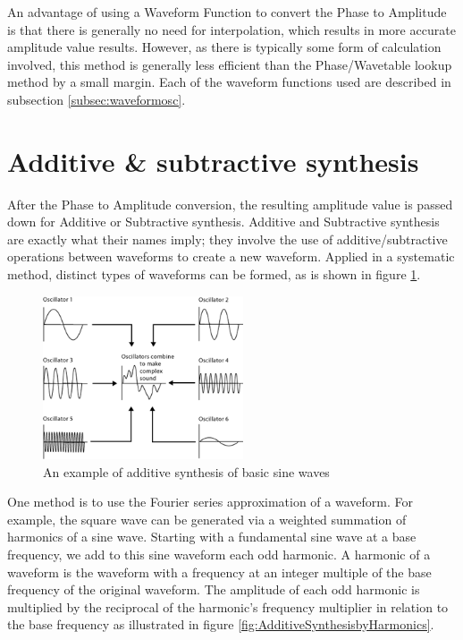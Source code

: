 \documentclass[a4paper,12pt]{report}
\begin{document}
An advantage of using a Waveform Function to convert the Phase to Amplitude is that there is generally no need for interpolation, which results in more accurate amplitude value results. However, as there is typically some form of calculation involved, this method is generally less efficient than the Phase/Wavetable lookup method by a small margin. Each of the waveform functions used are described in subsection \ref{subsec:waveformosc}.

\section{Additive \& subtractive synthesis}
\label{sec:addsubsynthesis}
After the Phase to Amplitude conversion, the resulting amplitude value is passed down for Additive or Subtractive synthesis. Additive and Subtractive synthesis are exactly what their names imply; they involve the use of additive/subtractive operations between waveforms to create a new waveform. Applied in a systematic method, distinct types of waveforms can be formed,  as is shown in figure \ref{fig:additivesynthesis}.

\begin{figure}[h]
    \centering
    \includegraphics[width=16em]{AdditiveSynthesis.png}
    \caption{An example of additive synthesis of basic sine waves}
    \label{fig:additivesynthesis}
\end{figure}

One method is to use the Fourier series approximation of a waveform. For example, the square wave can be generated via a weighted summation of harmonics of a sine wave. Starting with a fundamental sine wave at a base frequency, we add to this sine waveform each odd harmonic. A harmonic of a waveform is the waveform with a frequency at an integer multiple of the base frequency of the original waveform. The amplitude of each odd harmonic is multiplied by the reciprocal of the harmonic's frequency multiplier in relation to the base frequency as illustrated in figure \ref{fig:AdditiveSynthesisbyHarmonics}.
\end{document}
